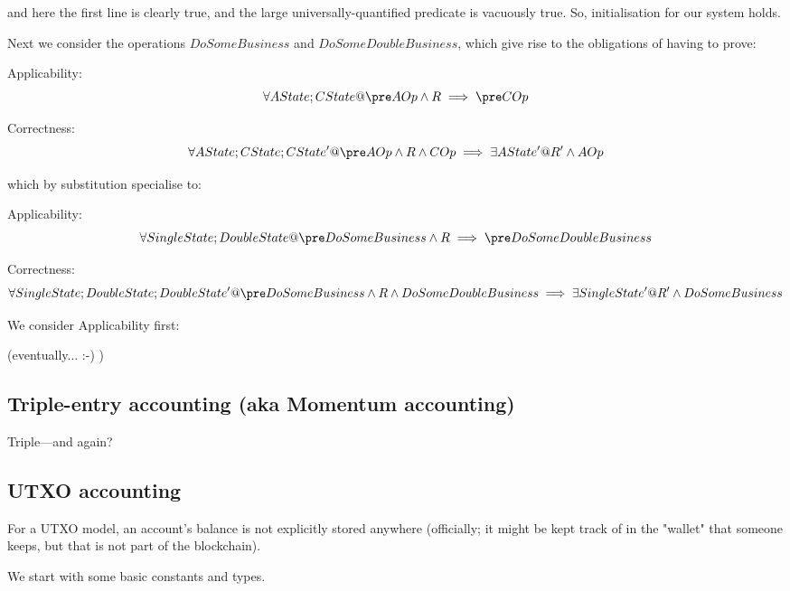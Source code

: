\documentclass[11pt]{amsart}
\begin{document}
and here the first line is clearly true, and the large universally-quantified predicate is vacuously true. So, initialisation for our system holds.

Next we consider the operations $DoSomeBusiness$ and $DoSomeDoubleBusiness$, which give rise to the obligations of having to prove:

\noindent Applicability:
\[
\forall AState; CState @ \pre AOp \land R \implies \pre COp
\]

\noindent Correctness:
\[
\forall AState; CState; CState' @ \pre AOp \land R \land COp \implies \exists AState' @ R' \land AOp
\]

which by substitution specialise to:

\noindent Applicability:
\[
\forall SingleState; DoubleState @ \pre DoSomeBusiness \land R \implies \pre DoSomeDoubleBusiness
\]

\noindent Correctness:
\[
\forall SingleState; DoubleState; DoubleState' @ \pre DoSomeBusiness \land R \land DoSomeDoubleBusiness \implies \exists SingleState' @ R' \land DoSomeBusiness
\]

We consider Applicability first:

(eventually... :-) )



\subsection{Triple-entry accounting (aka Momentum accounting)}

Triple---and again?

\subsection{UTXO accounting}

For a UTXO model, an account's balance is not explicitly stored anywhere
(officially; it might be kept track of in the "wallet" that someone keeps,
but that is not part of the blockchain).
 
We start with some basic constants and types.



%
%
%
\end{document}
